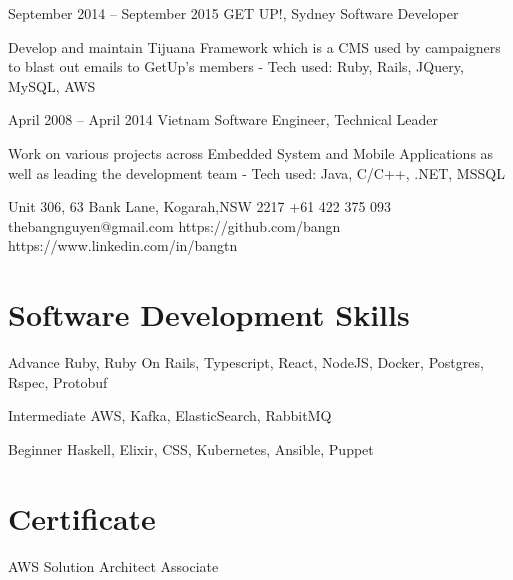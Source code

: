 \documentclass{tccv}
\begin{document}
\begin{eventlist}
\item{September 2014 -- September 2015}
    {GET UP!, Sydney}
    {Software Developer}

    Develop and maintain Tijuana Framework which is a CMS
    used by campaigners to blast out emails to GetUp's members
    \newline- Tech used: Ruby, Rails, JQuery, MySQL, AWS

\item{April 2008 -- April 2014}
    {Vietnam}
    {Software Engineer, Technical Leader}

    Work on various projects across Embedded System and Mobile Applications as well as leading the development team
    \newline- Tech used: Java, C/C++, .NET, MSSQL

\end{eventlist}

\personal
    {Unit 306, 63 Bank Lane, Kogarah,\newline NSW 2217}
    {+61 422 375 093}
    {thebangnguyen@gmail.com}
    {https://github.com/bangn}
    {https://www.linkedin.com/in/bangtn}

\section{Software Development Skills}

\begin{factlist}

\item{Advance}
    {Ruby, Ruby On Rails, Typescript, React, NodeJS, Docker, Postgres, Rspec, Protobuf}

\item{Intermediate}
    {AWS, Kafka, ElasticSearch, RabbitMQ}

\item{Beginner}
    {Haskell, Elixir, CSS, Kubernetes, Ansible, Puppet}
\end{factlist}

\section{Certificate}

\begin{factlist}

\item{AWS Solution Architect}
    {Associate}

\end{factlist}
\end{document}
